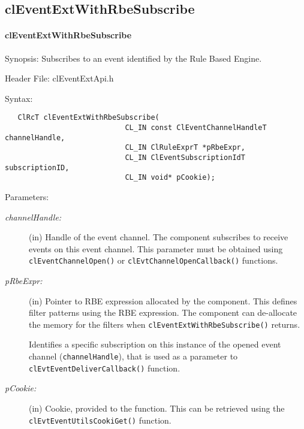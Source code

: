 \begin{flushleft}
\subsection{clEventExtWithRbeSubscribe}
\hypertarget{pageem202}{}\paragraph{cl\-Event\-Ext\-With\-Rbe\-Subscribe}\label{pageem202}
\begin{Desc}
\item[Synopsis:]Subscribes to an event identified by the Rule Based Engine.\end{Desc}
\begin{Desc}
\item[Header File:]clEventExtApi.h\end{Desc}
\begin{Desc}
\item[Syntax:]

\footnotesize\begin{verbatim}   ClRcT clEventExtWithRbeSubscribe(
              				CL_IN const ClEventChannelHandleT channelHandle,
              				CL_IN ClRuleExprT *pRbeExpr,
              				CL_IN ClEventSubscriptionIdT subscriptionID,
              				CL_IN void* pCookie);
\end{verbatim}
\normalsize
\end{Desc}
\begin{Desc}
\item[Parameters:]
\begin{description}
\item[{\em channel\-Handle:}](in) Handle of the event channel. The component subscribes to receive events on this event channel. This parameter must be 
obtained using {\tt{clEventChannelOpen()}} or {\tt{cl\-Evt\-Channel\-Open\-Callback()}} functions.

\item[{\em p\-Rbe\-Expr:}](in) Pointer to RBE expression allocated by the component. This defines filter patterns using the RBE expression. The component
can de-allocate the memory for the filters when {\tt{cl\-Event\-Ext\-With\-Rbe\-Subscribe()}} returns.

Identifies a specific subscription on this instance of the opened event channel ({\tt{channel\-Handle}}), that is used as
a parameter to {\tt{cl\-Evt\-Event\-Deliver\-Callback()}} function.

\item[{\em p\-Cookie:}](in) Cookie, provided to the function. This can be retrieved using the {\tt{cl\-Evt\-Event\-Utils\-Cooki\-Get()}} function.


\end{description}
\end{Desc}
\end{flushleft}
